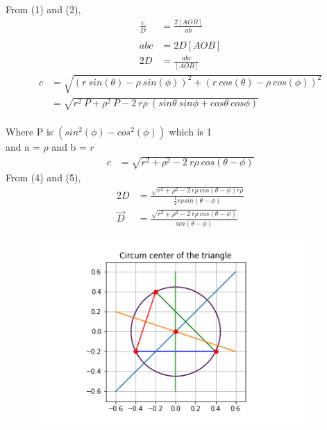 \documentclass[journal,12pt,twocolumn]{IEEEtran}
\begin{document}
From (1) and (2),
\begin{align}
\frac{c}{D} &= \frac{2[AOB]}{ab}\nonumber \\ \nonumber \\
abc &= 2D[AOB]\nonumber \\
2D &= \frac{abc}{[AOB]}
\end{align}
\begin{align}
c &= \sqrt{(r\:sin(\theta)-\rho\:sin(\phi))^2 + (r\:cos(\theta)-\rho\:cos(\phi))^2} \nonumber \\
&= \sqrt{r^2\:P + \rho^2\:P - 2\:r\rho\:(sin\theta\:sin\phi + cos\theta\:cos\phi)} \nonumber
\end{align}
\\
Where P is $(sin^2(\phi)-cos^2(\phi))$ which is 1 \\
and a = $\rho$ and b = $r$ \\
\begin{align}
c &= \sqrt{r^2 + \rho^2 - 2\:r\rho\: cos(\theta - \phi)}
\end{align}
From (4) and (5),
\begin{align}
2D &= \frac{\sqrt{r^2 + \rho^2 - 2\:r\rho\: cos(\theta - \phi) r \rho}}{\frac{1}{2}r \rho sin(\theta-\phi)} \nonumber \\
\vec{D} &= \frac{\sqrt{r^2 + \rho^2 - 2\:r\rho\: cos(\theta - \phi)}}{sin(\theta-\phi)}
\end{align}
\begin{figure}[!ht]
    \center
    \includegraphics[width=300pt]{assignment_1.png}
    \label{fig:assignment-1}
\end{figure}
\end{document}

